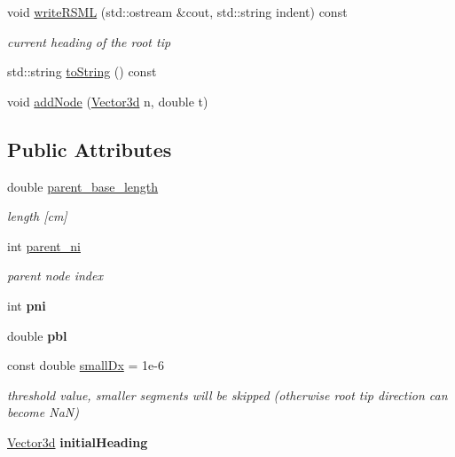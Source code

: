 \begin{DoxyCompactItemize}
void \hyperlink{classCPlantBox_1_1Root_accf492ad0fa522fccc43588d1cde4610}{write\+R\+S\+ML} (std\+::ostream \&cout, std\+::string indent) const
\begin{DoxyCompactList}\small\item\em current heading of the root tip \end{DoxyCompactList}\item 
std\+::string \hyperlink{classCPlantBox_1_1Root_a389312a40582e21c1eaa6c5ebb927f2e}{to\+String} () const
\item 
void \hyperlink{classCPlantBox_1_1Root_aa527dd6491af6dec3a3016eef66acc40}{add\+Node} (\hyperlink{classCPlantBox_1_1Vector3d}{Vector3d} n, double t)
\end{DoxyCompactItemize}
\subsection*{Public Attributes}
\begin{DoxyCompactItemize}
\item 
\mbox{\label{classCPlantBox_1_1Root_a84d07e9b762851c8e7a2d0208e3fff46}} 
double \hyperlink{classCPlantBox_1_1Root_a84d07e9b762851c8e7a2d0208e3fff46}{parent\+\_\+base\+\_\+length}
\begin{DoxyCompactList}\small\item\em length \mbox{[}cm\mbox{]} \end{DoxyCompactList}\item 
\mbox{\label{classCPlantBox_1_1Root_ac8c6cf81eee87f26287dbed81a052bf9}} 
int \hyperlink{classCPlantBox_1_1Root_ac8c6cf81eee87f26287dbed81a052bf9}{parent\+\_\+ni}
\begin{DoxyCompactList}\small\item\em parent node index \end{DoxyCompactList}\item 
\mbox{\label{classCPlantBox_1_1Root_a0820234809bb45cec6773bd84ae69575}} 
int {\bfseries pni}
\item 
\mbox{\label{classCPlantBox_1_1Root_a8fc18cb23e776c5bf0dfcf03391c0f79}} 
double {\bfseries pbl}
\item 
\mbox{\label{classCPlantBox_1_1Root_a41b690dc6568fed06e8ec3bbcf0e628e}} 
const double \hyperlink{classCPlantBox_1_1Root_a41b690dc6568fed06e8ec3bbcf0e628e}{small\+Dx} = 1e-\/6
\begin{DoxyCompactList}\small\item\em threshold value, smaller segments will be skipped (otherwise root tip direction can become NaN) \end{DoxyCompactList}\item 
\mbox{\label{classCPlantBox_1_1Root_a92f98515bfb7e7e205a6737c11477895}} 
\hyperlink{classCPlantBox_1_1Vector3d}{Vector3d} {\bfseries initial\+Heading}
\end{DoxyCompactItemize}
